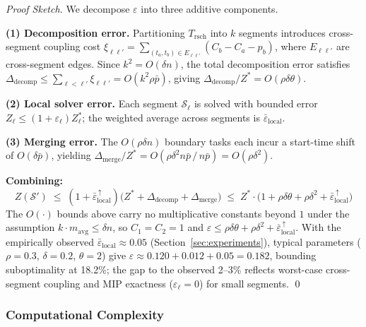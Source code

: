 \documentclass[manuscript,screen,review]{acmart}
\begin{document}
\begin{proof}[Proof Sketch]
We decompose $\varepsilon$ into three additive components.

\textbf{(1) Decomposition error.}
Partitioning $T_{\mathrm{rsch}}$ into $k$ segments introduces cross-segment
coupling cost $\xi_{\ell\ell'} = \sum_{(t_a,t_b)\in E_{\ell\ell'}}(C_b-C_a-p_b)$,
where $E_{\ell\ell'}$ are cross-segment edges.
Since $k^2 = O(\delta n)$, the total decomposition error satisfies
$\Delta_{\mathrm{decomp}} \leq \sum_{\ell<\ell'}\xi_{\ell\ell'} = O(k^2\rho\bar{p})$,
giving $\Delta_{\mathrm{decomp}}/Z^* = O(\rho\delta\theta)$.

\textbf{(2) Local solver error.}
Each segment $\mathcal{S}_\ell$ is solved with bounded error
$Z_\ell \leq (1+\varepsilon_\ell)Z_\ell^*$;
the weighted average across segments is $\bar{\varepsilon}_{\mathrm{local}}$.

\textbf{(3) Merging error.}
The $O(\rho\delta n)$ boundary tasks each incur a start-time shift of
$O(\delta\bar{p})$, yielding
$\Delta_{\mathrm{merge}}/Z^* = O(\rho\delta^2 n\bar{p}\,/\,n\bar{p}) = O(\rho\delta^2)$.

\textbf{Combining:}
\begin{equation}
  Z(\mathcal{S}')
  \;\leq\; (1+\bar{\varepsilon}_{\mathrm{local}}^{\,\uparrow})
  \bigl(Z^*+\Delta_{\mathrm{decomp}}+\Delta_{\mathrm{merge}}\bigr)
  \;\leq\; Z^*\!\cdot\!\bigl(1+\rho\delta\theta+\rho\delta^2
  +\bar{\varepsilon}_{\mathrm{local}}^{\,\uparrow}\bigr)
\end{equation}
The $O(\cdot)$ bounds above carry no multiplicative constants beyond $1$
under the assumption $k\cdot m_{\mathrm{avg}}\leq\delta n$,
so $C_1=C_2=1$ and
$\varepsilon \leq \rho\delta\theta+\rho\delta^2+\bar{\varepsilon}_{\mathrm{local}}^{\,\uparrow}$.
With the empirically observed $\bar{\varepsilon}_{\mathrm{local}}\approx 0.05$
(Section~\ref{sec:experiments}), typical parameters
($\rho{=}0.3$, $\delta{=}0.2$, $\theta{=}2$) give
$\varepsilon\approx 0.120+0.012+0.05=0.182$,
bounding suboptimality at 18.2\%; the gap to the observed 2--3\%
reflects worst-case cross-segment coupling and MIP exactness
($\varepsilon_\ell=0$) for small segments. \qed
\end{proof}

\subsubsection{Computational Complexity}
\end{document}
